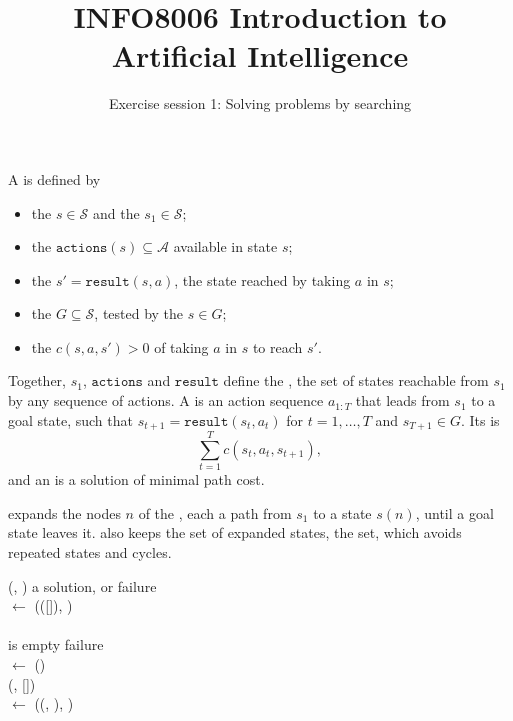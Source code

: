 \documentclass[11pt, a4paper]{exam}
\title{\bfseries INFO8006 Introduction to Artificial Intelligence}
\author{Exercise session 1: Solving problems by searching}
\date{}
\begin{document}
\maketitle

\begin{recap}
    A  is defined by
    \begin{itemize}
        \item the  $s \in \mathcal{S}$ and the  $s_1 \in \mathcal{S}$;
        \item the  $\texttt{actions}(s) \subseteq \mathcal{A}$ available in state $s$;
        \item the  $s' = \texttt{result}(s, a)$, the state reached by taking $a$ in $s$;
        \item the  $G \subseteq \mathcal{S}$, tested by the  $s \in G$;
        \item the  $c(s, a, s') > 0$ of taking $a$ in $s$ to reach $s'$.
    \end{itemize}
    Together, $s_1$, $\texttt{actions}$ and $\texttt{result}$ define the , the set of states reachable from $s_1$ by any sequence of actions. A  is an action sequence $a_{1:T}$ that leads from $s_1$ to a goal state, \ie{} such that $s_{t+1} = \texttt{result}(s_t, a_t)$ for $t = 1, \ldots, T$ and $s_{T+1} \in G$. Its  is
    \[
        \sum_{t=1}^T c(s_t, a_t, s_{t+1}),
    \]
    and an  is a solution of minimal path cost.

     expands the nodes $n$ of the , each a path from $s_1$ to a state $s(n)$, until a goal state leaves it.  also keeps the set of expanded states, the  set, which avoids repeated states and cycles.

    \begin{pseudocode}
         (, )  a solution, or failure \\
        \>  $\gets$ (([]), ) \\
        \>  \\
        \> \>   is empty  failure \\
        \> \>  $\gets$ () \\
        \> \>  (, [])   \\
        \> \>  $\gets$ ((, ), )
    \end{pseudocode}


\end{recap}
\end{document}
